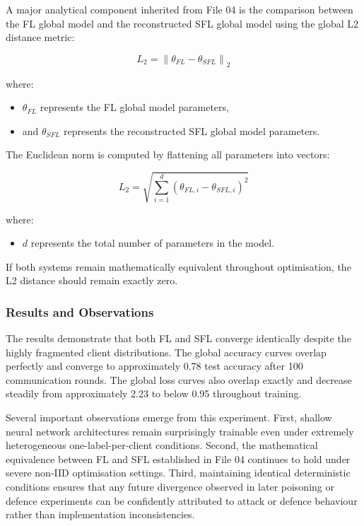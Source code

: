 A major analytical component inherited from File 04 is the comparison between the FL global model and the reconstructed SFL global model using the global L2 distance metric:

\[
L_2
=
\left\|
\theta_{FL}
-
\theta_{SFL}
\right\|_2
\]

where:
\begin{itemize}
    \item $\theta_{FL}$ represents the FL global model parameters,
    \item and $\theta_{SFL}$ represents the reconstructed SFL global model parameters.
\end{itemize}

The Euclidean norm is computed by flattening all parameters into vectors:

\[
L_2
=
\sqrt{
\sum_{i=1}^{d}
(\theta_{FL,i} - \theta_{SFL,i})^2
}
\]

where:
\begin{itemize}
    \item $d$ represents the total number of parameters in the model.
\end{itemize}

If both systems remain mathematically equivalent throughout optimisation, the L2 distance should remain exactly zero.

\vspace{0.3cm}

\subsubsection*{Results and Observations}

The results demonstrate that both FL and SFL converge identically despite the highly fragmented client distributions. The global accuracy curves overlap perfectly and converge to approximately 0.78 test accuracy after 100 communication rounds. The global loss curves also overlap exactly and decrease steadily from approximately 2.23 to below 0.95 throughout training.

Several important observations emerge from this experiment. First, shallow neural network architectures remain surprisingly trainable even under extremely heterogeneous one-label-per-client conditions. Second, the mathematical equivalence between FL and SFL established in File 04 continues to hold under severe non-IID optimisation settings. Third, maintaining identical deterministic conditions ensures that any future divergence observed in later poisoning or defence experiments can be confidently attributed to attack or defence behaviour rather than implementation inconsistencies.

